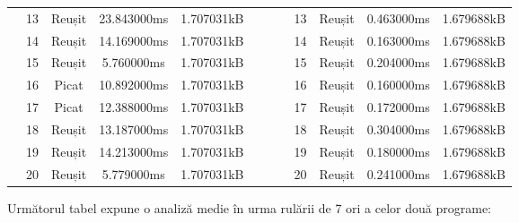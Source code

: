 \documentclass[runningheads]{llncs}
\begin{document}
\begin{table}[H]
\begin{tabular}{|c|c|c|c|c|cc|c|c|c|c|c|}
           & 13   & Reușit      & 23.843000ms & 1.707031kB &  &  &              & 13   & Reușit      & 0.463000ms & 1.679688kB \\ \cline{1-5} \cline{8-12} 
           & 14   & Reușit      & 14.169000ms & 1.707031kB &  &  &              & 14   & Reușit      & 0.163000ms & 1.679688kB \\ \cline{1-5} \cline{8-12} 
           & 15   & Reușit      & 5.760000ms  & 1.707031kB &  &  &              & 15   & Reușit      & 0.204000ms & 1.679688kB \\ \cline{1-5} \cline{8-12} 
           & 16   & Picat       & 10.892000ms & 1.707031kB &  &  &              & 16   & Reușit      & 0.160000ms & 1.679688kB \\ \cline{1-5} \cline{8-12} 
           & 17   & Picat       & 12.388000ms & 1.707031kB &  &  &              & 17   & Reușit      & 0.172000ms & 1.679688kB \\ \cline{1-5} \cline{8-12} 
           & 18   & Reușit      & 13.187000ms & 1.707031kB &  &  &              & 18   & Reușit      & 0.304000ms & 1.679688kB \\ \cline{1-5} \cline{8-12} 
           & 19   & Reușit      & 14.213000ms & 1.707031kB &  &  &              & 19   & Reușit      & 0.180000ms & 1.679688kB \\ \cline{1-5} \cline{8-12} 
           & 20   & Reușit      & 5.779000ms  & 1.707031kB &  &  &              & 20   & Reușit      & 0.241000ms & 1.679688kB \\ \cline{1-5} \cline{8-12} 
    \end{tabular}
    \end{table}

Următorul tabel expune o analiză medie în urma rulării de 7 ori a celor două programe:
\end{document}
